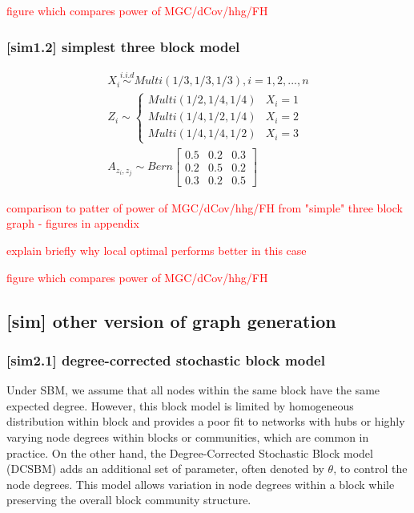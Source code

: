 \documentclass[12pt]{article}
\theoremstyle{definition}
\begin{document}
	
	\textcolor{red}{figure which compares power of MGC/dCov/hhg/FH}
	
	
	
\subsubsection{[sim1.2] simplest three block model}
	
	
	\begin{equation}
	\begin{gathered}
	X_{i} \overset{i.i.d}{\sim} Multi(1/3, 1/3, 1/3), i = 1,2, ... , n \\ 
	Z_{i}  \sim  \left\{  \begin{array}{ccc} Multi(1/2, 1/4, 1/4) & X_{i} = 1 \\ Multi(1/4, 1/2, 1/4) & X_{i} = 2 \\ Multi(1/4, 1/4, 1/2) & X_{i} = 3  \end{array} \right. \\
	A_{z_{i}, z_{j}} \sim Bern \left[  \begin{array}{ccc}   0.5 & 0.2 &  0.3  \\ 0.2 & 0.5 & 0. 2  \\ 0.3 & 0.2 & 0.5  \end{array}  \right]
	\end{gathered}
	\end{equation}
	
	\textcolor{red}{comparison to patter of power of MGC/dCov/hhg/FH from "simple" three block graph - figures in appendix}
	
	
	\textcolor{red}{explain briefly why local optimal performs better in this case}
	
	
	\textcolor{red}{figure which compares power of MGC/dCov/hhg/FH}
	
	
	
\subsection{[sim] other version of graph generation}
	
	
\subsubsection{[sim2.1] degree-corrected stochastic block model}
	
Under SBM, we assume that all nodes within the same block have the same expected degree. However, this block model is limited by homogeneous distribution within block and provides a poor fit to networks with hubs or highly varying node degrees within blocks or communities, which are common in practice. On the other hand, the Degree-Corrected Stochastic Block model (DCSBM) adds an additional set of parameter, often denoted by $\theta$, to control the node degrees. This model allows variation in node degrees within a block while preserving the overall block community structure. 
	
\end{document}
